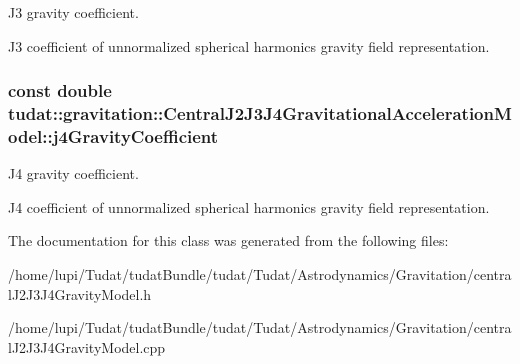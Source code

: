 J3 gravity coefficient. 

J3 coefficient of unnormalized spherical harmonics gravity field representation. 
\subsubsection[{\texorpdfstring{j4\+Gravity\+Coefficient}{j4GravityCoefficient}}]{\setlength{\rightskip}{0pt plus 5cm}const double tudat\+::gravitation\+::\+Central\+J2\+J3\+J4\+Gravitational\+Acceleration\+Model\+::j4\+Gravity\+Coefficient\hspace{0.3cm}{\ttfamily [protected]}}\hypertarget{classtudat_1_1gravitation_1_1CentralJ2J3J4GravitationalAccelerationModel_a7caa1cdd5f679d90350a0eeebca5661b}{}\label{classtudat_1_1gravitation_1_1CentralJ2J3J4GravitationalAccelerationModel_a7caa1cdd5f679d90350a0eeebca5661b}


J4 gravity coefficient. 

J4 coefficient of unnormalized spherical harmonics gravity field representation. 

The documentation for this class was generated from the following files\+:\begin{DoxyCompactItemize}
\item 
/home/lupi/\+Tudat/tudat\+Bundle/tudat/\+Tudat/\+Astrodynamics/\+Gravitation/central\+J2\+J3\+J4\+Gravity\+Model.\+h\item 
/home/lupi/\+Tudat/tudat\+Bundle/tudat/\+Tudat/\+Astrodynamics/\+Gravitation/central\+J2\+J3\+J4\+Gravity\+Model.\+cpp\end{DoxyCompactItemize}
